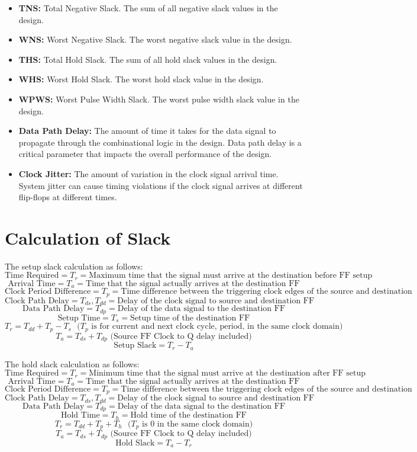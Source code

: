 \documentclass{report}
\begin{document}
\begin{itemize}
    \item \textbf{TNS: } Total Negative Slack. The sum of all negative slack values in the design.
    \item \textbf{WNS: } Worst Negative Slack. The worst negative slack value in the design.
    \item \textbf{THS: } Total Hold Slack. The sum of all hold slack values in the design.
    \item \textbf{WHS: } Worst Hold Slack. The worst hold slack value in the design.
    \item \textbf{WPWS: } Worst Pulse Width Slack. The worst pulse width slack value in the design.
    \item \textbf{Data Path Delay: } The amount of time it takes for the data signal to propagate through the combinational logic in the design. Data path delay is a critical parameter that impacts the overall performance of the design.
    \item \textbf{Clock Jitter: } The amount of variation in the clock signal arrival time. System jitter can cause timing violations if the clock signal arrives at different flip-flops at different times.
\end{itemize}
\section{Calculation of Slack}
The setup slack calculation as follows:
\[\text{Time Required} = T_r = \text{Maximum time that the signal must arrive at the destination before FF setup}\]
\[\text{Arrival Time} = T_a = \text{Time that the signal actually arrives at the destination FF}\]
\[\text{Clock Period Difference} = T_p = \text{Time difference between the triggering clock edges of the source and destination FFs}\]
\[\text{Clock Path Delay} = T_{ds}, T_{dd} = \text{Delay of the clock signal to source and destination FF}\]
\[\text{Data Path Delay} = T_{dp} = \text{Delay of the data signal to the destination FF}\]
\[\text{Setup Time} = T_s = \text{Setup time of the destination FF}\]
\[T_r = T_{dd} + T_p - T_s \text{ } (T_p \text{ is for current and next clock cycle, period, in the same clock domain)} \]
\[T_a = T_{ds} + T_{dp} \text{ (Source FF Clock to Q delay included)} \]
\[\text{Setup Slack} = T_r - T_a\]

The hold slack calculation as follows:
\[\text{Time Required} = T_r = \text{Minimum time that the signal must arrive at the destination after FF setup}\]
\[\text{Arrival Time} = T_a = \text{Time that the signal actually arrives at the destination FF}\]
\[\text{Clock Period Difference} = T_p = \text{Time difference between the triggering clock edges of the source and destination FFs}\]
\[\text{Clock Path Delay} = T_{ds}, T_{dd} = \text{Delay of the clock signal to source and destination FF}\]
\[\text{Data Path Delay} = T_{dp} = \text{Delay of the data signal to the destination FF}\]
\[\text{Hold Time} = T_h = \text{Hold time of the destination FF}\]
\[T_r = T_{dd} + T_p + T_h \text{ } (T_p \text{ is 0 in the same clock domain)} \]
\[T_a = T_{ds} + T_{dp} \text{ (Source FF Clock to Q delay included)} \]
\[\text{Hold Slack} = T_a - T_r\]
\end{document}
